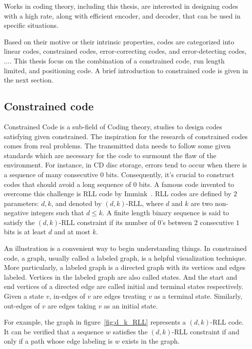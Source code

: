 Works in coding theory, including this thesis, are interested in designing codes with a high rate, along with efficient encoder, and decoder, that can be used in specific situations. 

Based on their motive or their intrinsic properties, codes are categorized into linear codes, constrained codes, error-correcting codes, and error-detecting codes, $\ldots$. This thesis focus on the combination of a constrained code, run length limited, and positioning code. A brief introduction to constrained code is given in the next section.

\subsection{Constrained code}\label{subsec:constrained_code}
Constrained Code is a sub-field of Coding theory, studies to design codes satisfying given constrained. The inspiration for the research of constrained codes comes from real problems. The transmitted data needs to follow some given standards which are necessary for the code to surmount the flaw of the environment. For instance, in CD disc storage, errors tend to occur when there is a sequence of many consecutive $0$ bits. Consequently, it's crucial to construct codes that should avoid a long sequence of $0$ bits. A famous code invented to overcome this challenge is \gls{RLL} code by Immink~\cite{immink1990runlength}. \gls{RLL} codes are defined by $2$ parameters: $d, k$, and denoted by $(d,k)$-RLL, where $d$ and $k$ are two non-negative integers such that $d\leq k$. A finite length binary sequence 
is said to satisfy the $(d,k)$-RLL constraint if its number of $0$'s between $2$ consecutive $1$ bits is at least $d$ and at most $k$.

An illustration is a convenient way to begin understanding things. In constrained code, a graph, usually called a labeled graph, is a helpful visualization technique. More particularly, a labeled graph is a directed graph with its vertices and edges labeled. Vertices in the labeled graph are also called states. And the start and end vertices of a directed edge are called initial and terminal states respectively. Given a state $v$, in-edges of $v$ are edges treating $v$ as a terminal state. Similarly, out-edges of $v$ are edges taking $v$ as an initial state. 

For example, the graph in figure~\ref{fig:d_k_RLL} represents a $(d,k)$-RLL code. It can be verified that a sequence $w$ satisfies the $(d,k)$-RLL constraint if and only if a path whose edge labeling is $w$ exists in the graph.

